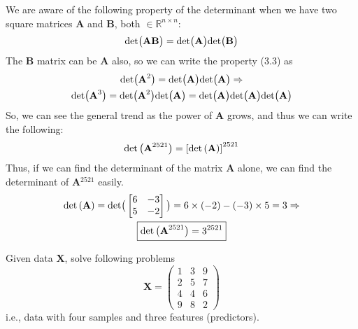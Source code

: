 \documentclass{homework}
\begin{document}
	We are aware of the following property of the determinant when we have two square matrices \textbf{A} and \textbf{B}, both $\in \mathbb{R}^{n\times n}$:
    \begin{equation}
        \text{det}\big(\text{\textbf{AB}}\big) = \text{det}\big(\text{\textbf{A}}\big)\text{det}\big(\text{\textbf{B}}\big)
    \end{equation}
    The \textbf{B} matrix can be \textbf{A} also, so we can write the property (3.3) as
    \begin{equation*}
    \begin{gathered}
        \text{det}\big(\text{\textbf{A}}^2\big) = \text{det}\big(\text{\textbf{A}}\big)\text{det}\big(\text{\textbf{A}}\big) \Rightarrow \\
        \text{det}\big(\text{\textbf{A}}^3\big) = \text{det}\big(\text{\textbf{A}}^2\big)\text{det}\big(\text{\textbf{A}}\big) = \text{det}\big(\text{\textbf{A}}\big)\text{det}\big(\text{\textbf{A}}\big)\text{det}\big(\text{\textbf{A}}\big)
    \end{gathered}
        \end{equation*}
    So, we can see the general trend as the power of \textbf{A} grows, and thus we can write the following:
	\begin{equation*}
	    \text{det}\left(\text{\textbf{A}}^{2521}\right) = \left[\text{det}\left(\text{\textbf{A}}\right)\right]^{2521}
	\end{equation*}
	Thus, if we can find the determinant of the matrix \textbf{A} alone, we can find the determinant of \textbf{A}$^{2521}$ easily.
    \begin{equation*}
    \begin{gathered}
        	\text{det}\left(\text{\textbf{A}}\right) = \text{det}\big(\left[
        \begin{matrix}
        6 & -3 \\
        5  & -2 \\
        \end{matrix}
        \right]\big) = 6\times(-2) - (-3)\times5 = 3 \Rightarrow \\
        \boxed{\text{det}\left(\text{\textbf{A}}^{2521}\right) = 3^{2521}}
    \end{gathered}
    \end{equation*}
	
	
	\vspace{10mm}
    
    \exercise*
    Given data \textbf{X}, solve following problems
    $$ \textbf{X} = \left( \begin{matrix} 1 & 3 & 9 \\ 2 & 5 & 7 \\ 4 & 4 & 6 \\ 9 & 8 & 2 \end{matrix} \right) $$
    i.e., data with four samples and three features (predictors).
    
\end{document}
